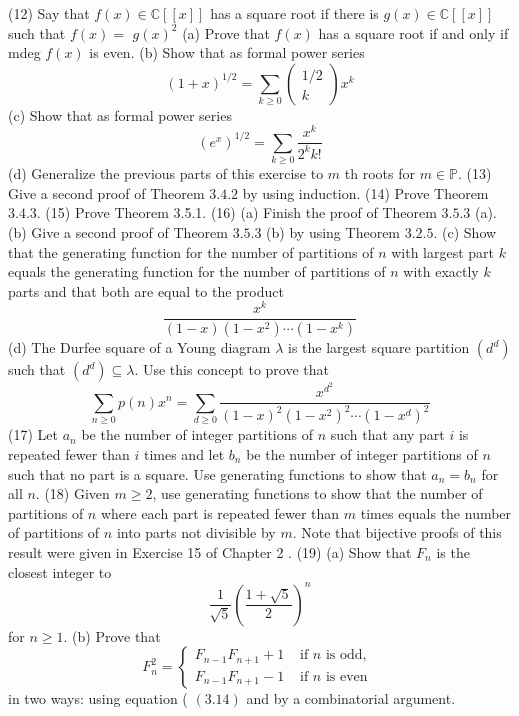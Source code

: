 \documentclass[a4paper,12pt]{ctexbook}
\begin{document}
(12) Say that $f(x) \in \mathbb{C}[[x]]$ has a square root if there is $g(x) \in \mathbb{C}[[x]]$ such that $f(x)=$ $g(x)^{2}$
(a) Prove that $f(x)$ has a square root if and only if mdeg $f(x)$ is even.
(b) Show that as formal power series
$$
(1+x)^{1 / 2}=\sum_{k \geq 0}\left(\begin{array}{c}
1 / 2 \\
k
\end{array}\right) x^{k}
$$
(c) Show that as formal power series
$$
\left(e^{x}\right)^{1 / 2}=\sum_{k \geq 0} \frac{x^{k}}{2^{k} k !}
$$
(d) Generalize the previous parts of this exercise to $m$ th roots for $m \in \mathbb{P}$.
(13) Give a second proof of Theorem $3.4 .2$ by using induction.
(14) Prove Theorem $3.4 .3$.
(15) Prove Theorem 3.5.1.
(16) (a) Finish the proof of Theorem $3.5 .3$ (a).
(b) Give a second proof of Theorem $3.5 .3$ (b) by using Theorem $3.2 .5$.
(c) Show that the generating function for the number of partitions of $n$ with largest part $k$ equals the generating function for the number of partitions of $n$ with exactly $k$ parts and that both are equal to the product
$$
\frac{x^{k}}{(1-x)\left(1-x^{2}\right) \cdots\left(1-x^{k}\right)}
$$
(d) The Durfee square of a Young diagram $\lambda$ is the largest square partition $\left(d^{d}\right)$ such that $\left(d^{d}\right) \subseteq \lambda$. Use this concept to prove that
$$
\sum_{n \geq 0} p(n) x^{n}=\sum_{d \geq 0} \frac{x^{d^{2}}}{(1-x)^{2}\left(1-x^{2}\right)^{2} \cdots\left(1-x^{d}\right)^{2}}
$$
(17) Let $a_{n}$ be the number of integer partitions of $n$ such that any part $i$ is repeated fewer than $i$ times and let $b_{n}$ be the number of integer partitions of $n$ such that no part is a square. Use generating functions to show that $a_{n}=b_{n}$ for all $n$.
(18) Given $m \geq 2$, use generating functions to show that the number of partitions of $n$ where each part is repeated fewer than $m$ times equals the number of partitions of $n$ into parts not divisible by $m$. Note that bijective proofs of this result were given in Exercise 15 of Chapter 2 .
(19) (a) Show that $F_{n}$ is the closest integer to
$$
\frac{1}{\sqrt{5}}\left(\frac{1+\sqrt{5}}{2}\right)^{n}
$$
for $n \geq 1$.
(b) Prove that
$$
F_{n}^{2}= \begin{cases}F_{n-1} F_{n+1}+1 & \text { if } n \text { is odd, } \\ F_{n-1} F_{n+1}-1 & \text { if } n \text { is even }\end{cases}
$$
in two ways: using equation ( $(3.14)$ and by a combinatorial argument.
\end{document}
